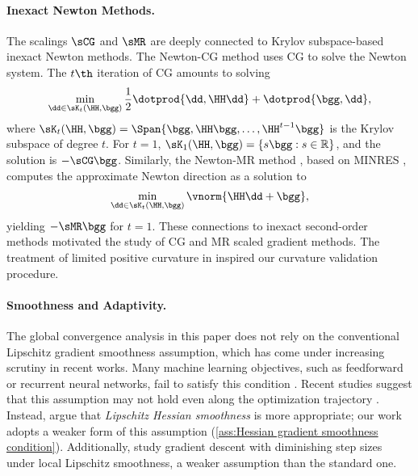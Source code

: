 \paragraph{Inexact Newton Methods.} 
The scalings $\sCG$ and $\sMR$ are deeply connected to Krylov subspace-based inexact Newton methods. The Newton-CG method \cite{nocedalNumericalOptimization2006} uses CG to solve the Newton system. The $t\th$ iteration of CG amounts to solving  
\begin{align*}
    \min_{\dd \in \sK_t(\HH, \bgg)} \frac{1}{2}\dotprod{\dd, \HH \dd} + \dotprod{\bgg, \dd},
\end{align*}
where $\sK_t(\HH, \bgg) = \Span \{ \bgg, \HH\bgg, \dots, \HH^{t-1} \bgg \}$ is the Krylov subspace of degree $t$. For $t = 1$, $\sK_1(\HH, \bgg) = \{ s \bgg : s \in \mathbb{R} \}$, and the solution is $-\sCG \bgg$. Similarly, the Newton-MR method \cite{roostaNewtonMRInexactNewton2022, liuNewtonMRAlgorithmComplexity2023,smeeInexactNewtontypeMethods2024,limComplexityGuaranteesNonconvex2024}, based on MINRES \cite{paige1975solution}, computes
the approximate Newton direction as a solution to
\begin{align*}
    \min_{\dd \in \sK_t(\HH, \bgg)} \vnorm{\HH \dd + \bgg},
\end{align*}
yielding $-\sMR \bgg$ for $t = 1$. These connections to inexact second-order methods motivated the study of CG and MR scaled gradient methods. The treatment of limited positive curvature in \cite{smeeInexactNewtontypeMethods2024, limComplexityGuaranteesNonconvex2024} inspired our curvature validation procedure.

\vspace{-1mm}
\paragraph{Smoothness and Adaptivity.} 
The global convergence analysis in this paper does not rely on the conventional Lipschitz gradient smoothness assumption, which has come under increasing scrutiny in recent works. Many machine learning objectives, such as feedforward or recurrent neural networks, fail to satisfy this condition \cite{patelGlobalConvergenceStability2022}. Recent studies suggest that this assumption may not hold even along the optimization trajectory \cite{cohenGradientDescentNeural2022}. Instead, \citet[Remark 5]{ahnUnderstandingUnstableConvergence2022} argue that {\em Lipschitz Hessian smoothness} is more appropriate; our work adopts a weaker form of this assumption (\cref{ass:Hessian gradient smoothness condition}). Additionally, \citet{patelGradientDescentAbsence2023} study gradient descent with diminishing step sizes under local Lipschitz smoothness, a weaker assumption than the standard one.

